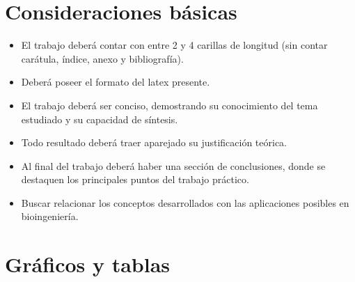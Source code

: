 \documentclass[10pt]{article}
\begin{document}
\vspace{0.2cm}


\pagestyle{fancy}
\headheight=60pt 	%




\section{Consideraciones básicas}

\begin{itemize}
    \item El trabajo deberá contar con entre 2 y 4 carillas de longitud (sin contar carátula, índice, anexo y bibliografía).
    \item Deberá poseer el formato del latex presente.
    \item El trabajo deberá ser conciso, demostrando su conocimiento del tema estudiado y su capacidad de síntesis.
    \item Todo resultado deberá traer aparejado su justificación teórica.
    \item Al final del trabajo deberá haber una sección de conclusiones, donde se destaquen los principales puntos del trabajo práctico.
    \item Buscar relacionar los conceptos desarrollados con las aplicaciones posibles en bioingeniería.
\end{itemize}



\section{Gráficos y tablas}
\end{document}
